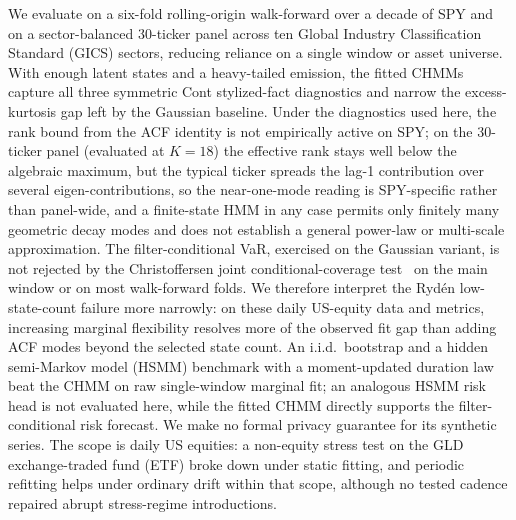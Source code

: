 We evaluate on a six-fold rolling-origin walk-forward over a decade of SPY and on a sector-balanced 30-ticker panel across ten Global Industry Classification Standard (GICS) sectors, reducing reliance on a single window or asset universe. With enough latent states and a heavy-tailed emission, the fitted CHMMs capture all three symmetric Cont stylized-fact diagnostics and narrow the excess-kurtosis gap left by the Gaussian baseline. Under the diagnostics used here, the rank bound from the ACF identity is not empirically active on SPY; on the 30-ticker panel (evaluated at $K = 18$) the effective rank stays well below the algebraic maximum, but the typical ticker spreads the lag-1 contribution over several eigen-contributions, so the near-one-mode reading is SPY-specific rather than panel-wide, and a finite-state HMM in any case permits only finitely many geometric decay modes and does not establish a general power-law or multi-scale approximation. The filter-conditional VaR, exercised on the Gaussian variant, is not rejected by the Christoffersen joint conditional-coverage test~\cite{christoffersen1998evaluating} on the main window or on most walk-forward folds. We therefore interpret the Ryd\'{e}n low-state-count failure more narrowly: on these daily US-equity data and metrics, increasing marginal flexibility resolves more of the observed fit gap than adding ACF modes beyond the selected state count. An i.i.d.\ bootstrap and a hidden semi-Markov model (HSMM) benchmark with a moment-updated duration law beat the CHMM on raw single-window marginal fit; an analogous HSMM risk head is not evaluated here, while the fitted CHMM directly supports the filter-conditional risk forecast. We make no formal privacy guarantee for its synthetic series. The scope is daily US equities: a non-equity stress test on the GLD exchange-traded fund (ETF) broke down under static fitting, and periodic refitting helps under ordinary drift within that scope, although no tested cadence repaired abrupt stress-regime introductions.
